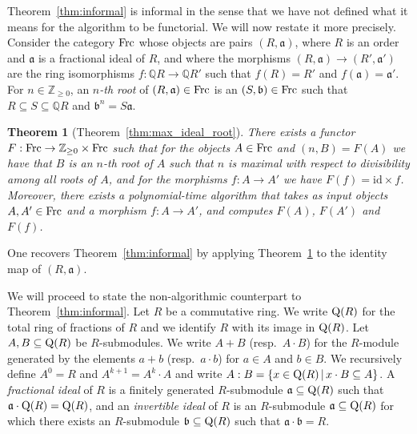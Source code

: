 \documentclass{amsart}
\theoremstyle{plain}
\newtheorem{theorem}{Theorem}[section]
\theoremstyle{definition}
\newcommand{\id}{\mathrm{id}}
\newcommand{\Z}{\ensuremath{\mathbb{Z}}}
\newcommand{\Q}{\ensuremath{\mathbb{Q}}}
\begin{document}
Theorem~\ref{thm:informal} is informal in the sense that we have not defined what it means for the algorithm to be functorial. We will now restate it more precisely.
Consider the category $\textup{Frc}$ whose objects are pairs $(R,\mathfrak{a})$, where $R$ is an order and $\mathfrak{a}$ is a fractional ideal of $R$, and where the morphisms $(R,\mathfrak{a})\to(R',\mathfrak{a}')$ are the ring isomorphisms $f:\Q R\to \Q R'$ such that $f(R)=R'$ and $f(\mathfrak{a})=\mathfrak{a}'$. 
For $n\in\Z_{\geq 0}$, an \emph{$n$-th root} of $(R,\mathfrak{a})\in\textup{Frc}$ is an $(S,\mathfrak{b})\in\textup{Frc}$ such that $R\subseteq S\subseteq \Q R$ and $\mathfrak{b}^n=S\mathfrak{a}$.

\begin{theorem}[Theorem~\ref{thm:max_ideal_root}]\label{mainthm:max_ideal_root}
There exists a functor $F:\textup{Frc}\to\Z_{\geq0}\times \textup{Frc}$ such that for the objects $A\in\textup{Frc}$ and $(n,B)=F(A)$ we have that $B$ is an $n$-th root of $A$ such that $n$ is maximal with respect to divisibility among all roots of $A$, and for the morphisms $f:A\to A'$ we have $F(f)=\id \times f$. 
Moreover, there exists a polynomial-time algorithm that takes as input objects $A,A'\in\textup{Frc}$ and a morphism $f:A\to A'$, and computes $F(A)$, $F(A')$ and $F(f)$.
\end{theorem}

One recovers Theorem~\ref{thm:informal} by applying Theorem~\ref{mainthm:max_ideal_root} to the identity map of $(R,\mathfrak{a})$.

We will proceed to state the non-algorithmic counterpart to Theorem~\ref{thm:informal}.
Let \(R\) be a commutative ring.
We write \(\textup{Q}(R)\) for the total ring of fractions of \(R\) and we identify \(R\) with its image in \(\textup{Q}(R)\).
Let \(A,B\subseteq\textup{Q}(R)\) be \(R\)-submodules.
We write \(A+B\) (resp.\ \(A\cdot B\)) for the \(R\)-module generated by the elements \(a+b\) (resp.\ \(a\cdot b\)) for \(a\in A\) and \(b\in B\).
We recursively define \(A^0=R\) and \(A^{k+1}=A^k\cdot A\) and write \(A:B=\{x\in\textup{Q}(R)\,|\, x\cdot B\subseteq A\}\).
A \emph{fractional ideal} of \(R\) is a finitely generated \(R\)-submodule \(\mathfrak{a}\subseteq \textup{Q}(R)\) such that \(\mathfrak{a}\cdot \textup{Q}(R)=\textup{Q}(R)\), and an \emph{invertible ideal} of \(R\) is an \(R\)-submodule \(\mathfrak{a}\subseteq\textup{Q}(R)\) for which there exists an \(R\)-submodule \(\mathfrak{b}\subseteq\textup{Q}(R)\) such that \(\mathfrak{a}\cdot \mathfrak{b} = R\).
\end{document}
